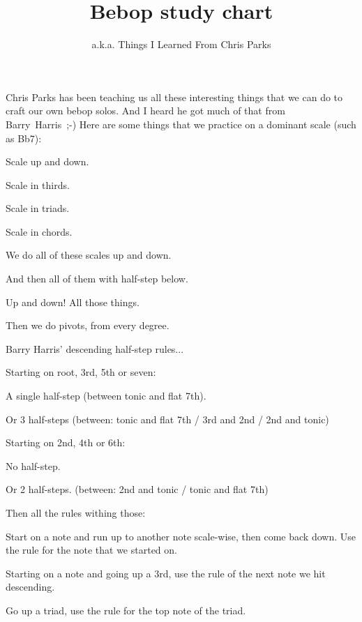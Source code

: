 \documentclass[a4paper,10pt,english]{article}
\title{\vspace{-5cm}Bebop study chart}
\author{\small a.k.a. Things I Learned From Chris Parks}
\begin{document}
\maketitle
Chris Parks has been teaching us all these interesting things that we can do to craft our own bebop solos. And I heard he got much of that from Barry~Harris~;-)
\linebreak
\linebreak
Here are some things that we practice on a dominant scale (such as Bb7):

  \begin{todolist}
    \item Scale up and down.
    \item Scale in thirds.
    \item Scale in triads.
    \item Scale in chords.
    \item We do all of these scales up and down.
    \item And then all of them with half-step below.
    \item Up and down! All those things.
    \item Then we do pivots, from every degree.
    \item Barry Harris' descending half-step rules...
    \item Starting on root, 3rd, 5th or seven:
    \begin{todolist}
      \item A single half-step (between tonic and flat 7th).
      \item Or 3 half-steps (between: tonic and flat 7th / 3rd and 2nd / 2nd and tonic)
    \end{todolist}
    \item Starting on 2nd, 4th or 6th:
    \begin{todolist}
      \item No half-step.
      \item Or 2 half-steps. (between: 2nd and tonic / tonic and flat 7th)
    \end{todolist}
    \item Then all the rules withing those:
    \begin{todolist}
    \item Start on a note and run up to another note scale-wise, then come back down. Use the rule for the note that we started on.
    \item Starting on a note and going up a 3rd, use the rule of the next note we hit descending.
    \item Go up a triad, use the rule for the top note of the triad.

\end{todolist}
\end{todolist}
\end{document}
